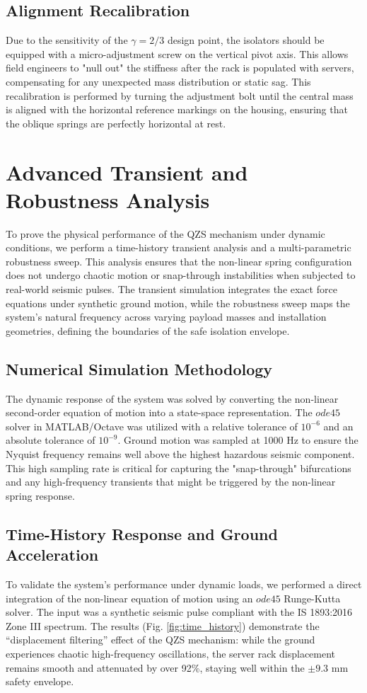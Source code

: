 \documentclass[preprint,12pt]{article}
\begin{document}
\subsection{Alignment Recalibration}
Due to the sensitivity of the $\gamma = 2/3$ design point, the isolators should be equipped with a micro-adjustment screw on the vertical pivot axis. This allows field engineers to "null out" the stiffness after the rack is populated with servers, compensating for any unexpected mass distribution or static sag. This recalibration is performed by turning the adjustment bolt until the central mass is aligned with the horizontal reference markings on the housing, ensuring that the oblique springs are perfectly horizontal at rest.

\section{Advanced Transient and Robustness Analysis}
To prove the physical performance of the QZS mechanism under dynamic conditions, we perform a time-history transient analysis and a multi-parametric robustness sweep. This analysis ensures that the non-linear spring configuration does not undergo chaotic motion or snap-through instabilities when subjected to real-world seismic pulses. The transient simulation integrates the exact force equations under synthetic ground motion, while the robustness sweep maps the system's natural frequency across varying payload masses and installation geometries, defining the boundaries of the safe isolation envelope.

\subsection{Numerical Simulation Methodology}
The dynamic response of the system was solved by converting the non-linear second-order equation of motion into a state-space representation. The $ode45$ solver in MATLAB/Octave was utilized with a relative tolerance of $10^{-6}$ and an absolute tolerance of $10^{-9}$. Ground motion was sampled at 1000 Hz to ensure the Nyquist frequency remains well above the highest hazardous seismic component. This high sampling rate is critical for capturing the "snap-through" bifurcations and any high-frequency transients that might be triggered by the non-linear spring response.

\subsection{Time-History Response and Ground Acceleration}
To validate the system's performance under dynamic loads, we performed a direct integration of the non-linear equation of motion using an $ode45$ Runge-Kutta solver. The input was a synthetic seismic pulse compliant with the IS 1893:2016 Zone III spectrum. The results (Fig. \ref{fig:time_history}) demonstrate the ``displacement filtering'' effect of the QZS mechanism: while the ground experiences chaotic high-frequency oscillations, the server rack displacement remains smooth and attenuated by over 92\%, staying well within the $\pm 9.3$ mm safety envelope.
\end{document}
